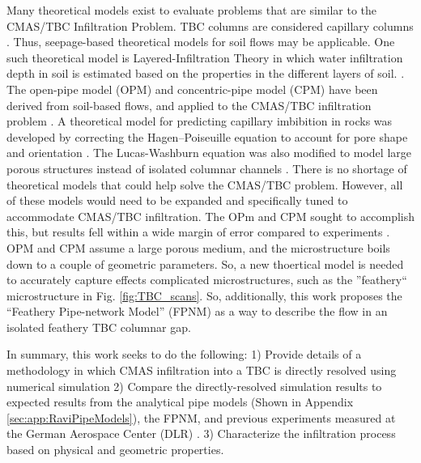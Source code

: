 \documentclass[%
 aip,
 amsmath,amssymb,
 reprint,%
floatfix]{revtex4-1}
\begin{document}
Many theoretical models exist to evaluate problems that are similar to the CMAS/TBC Infiltration Problem. TBC columns are considered capillary columns \cite{Naraparaju2017}. Thus, seepage-based theoretical models for soil flows may be applicable. One such theoretical model is Layered-Infiltration Theory in which water infiltration depth in soil is estimated based on the properties in the different layers of soil. \cite{ZHAO2024100028}. The open-pipe model (OPM) and concentric-pipe model (CPM) have been derived from soil-based flows, and applied to the CMAS/TBC infiltration problem \cite{CARMAN1997S32, Chapuis2003616, Naraparaju2019}. A theoretical model for predicting capillary imbibition in rocks was developed by correcting the Hagen–Poiseuille equation to account for pore shape and orientation \cite{Benavente2002}. The Lucas-Washburn equation was also modified to model large porous structures instead of isolated columnar channels \cite{Cai2021}. There is no shortage of theoretical models that could help solve the CMAS/TBC problem. However, all of these models would need to be expanded and specifically tuned to accommodate CMAS/TBC infiltration. The OPm and CPM sought to accomplish this, but results fell within a wide margin of error compared to experiments \cite{Naraparaju2019}. OPM and CPM assume a large porous medium, and the microstructure boils down to a couple of geometric parameters. So, a new thoertical model is needed to accurately capture effects complicated microstructures, such as the ''feathery`` microstructure in Fig. \ref{fig:TBC_scans}. So, additionally, this work proposes the ``Feathery Pipe-network Model'' (FPNM) as a way to describe the flow in an isolated feathery TBC columnar gap. 



In summary, this work seeks to do the following: 1) Provide details of a methodology in which CMAS infiltration into a TBC is directly resolved using numerical simulation 2) Compare the directly-resolved simulation results to expected results from the analytical pipe models \cite{Naraparaju2019} (Shown in Appendix \ref{sec:app:RaviPipeModels}), the FPNM, and previous experiments measured at the German Aerospace Center (DLR) \cite{Naraparaju2019}. 3) Characterize the infiltration process based on physical and geometric properties.
\end{document}

